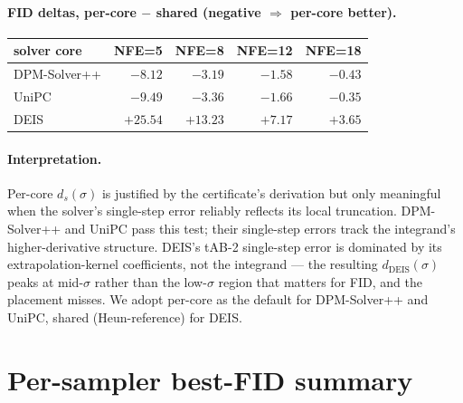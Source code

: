 \documentclass[11pt]{article}
\begin{document}
\paragraph{FID deltas, per-core $-$ shared (negative $\Rightarrow$ per-core better).}
\begin{center}
\small
\begin{tabular}{l r r r r}
\toprule
solver core & NFE=5 & NFE=8 & NFE=12 & NFE=18 \\
\midrule
DPM-Solver++ & $-8.12$ & $-3.19$ & $-1.58$ & $-0.43$ \\
UniPC        & $-9.49$ & $-3.36$ & $-1.66$ & $-0.35$ \\
DEIS         & $+25.54$ & $+13.23$ & $+7.17$ & $+3.65$ \\
\bottomrule
\end{tabular}
\end{center}

\paragraph{Interpretation.} Per-core $d_s(\sigma)$ is justified by the certificate's derivation but only meaningful when the solver's single-step error reliably reflects its local truncation. DPM-Solver++ and UniPC pass this test; their single-step errors track the integrand's higher-derivative structure. DEIS's tAB-2 single-step error is dominated by its extrapolation-kernel coefficients, not the integrand --- the resulting $d_{\mathrm{DEIS}}(\sigma)$ peaks at mid-$\sigma$ rather than the low-$\sigma$ region that matters for FID, and the placement misses. We adopt per-core as the default for DPM-Solver++ and UniPC, shared (Heun-reference) for DEIS.

\section{Per-sampler best-FID summary}
\end{document}
